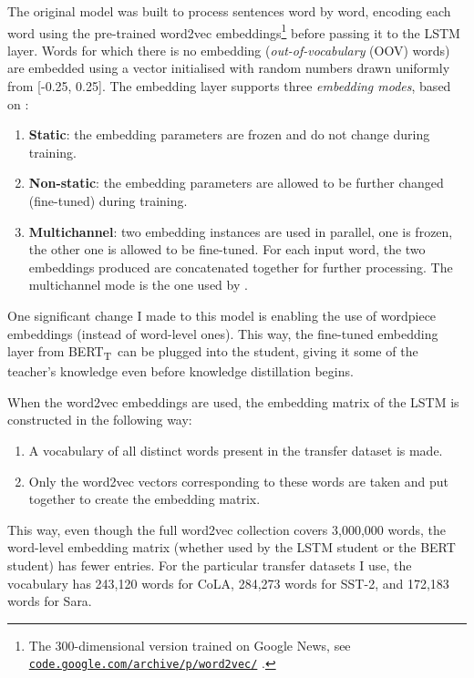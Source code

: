 \documentclass[bsc,frontabs,twoside,singlespacing,parskip,deptreport]{infthesis}
\def\BERTT{BERT\textsubscript{T}}
\newcommand\rurl[1]{%
  \href{https://#1}{\nolinkurl{#1}}%
}
\begin{document}
{{{      The original model was built to process sentences word by word, encoding each word using the pre-trained word2vec embeddings\footnote{The 300-dimensional version trained on Google News, see \rurl{code.google.com/archive/p/word2vec/}.} before passing it to the LSTM layer. Words for which there is no embedding (\textit{out-of-vocabulary} (OOV) words) are embedded using a vector initialised with random numbers drawn uniformly from [-0.25, 0.25]. The embedding layer supports three \textit{embedding modes}, based on \citet{Kim_2014}:
      \begin{enumerate}
        \item \textbf{Static}: the embedding parameters are frozen and do not change during training.
        \item \textbf{Non-static}: the embedding parameters are allowed to be further changed (fine-tuned) during training.
        \item \textbf{Multichannel}: two embedding instances are used in parallel, one is frozen, the other one is allowed to be fine-tuned. For each input word, the two embeddings produced are concatenated together for further processing. The multichannel mode is the one used by \citeauthor{Tang_2019b}.
      \end{enumerate}

      One significant change I made to this model is enabling the use of wordpiece embeddings (instead of word-level ones). This way, the fine-tuned embedding layer from \BERTT~can be plugged into the student, giving it some of the teacher's knowledge even before knowledge distillation begins.

      When the word2vec embeddings are used, the embedding matrix of the LSTM is constructed in the following way:
      \begin{enumerate}
        \item A vocabulary of all distinct words present in the transfer dataset is made.
        \item Only the word2vec vectors corresponding to these words are taken and put together to create the embedding matrix.
      \end{enumerate}
      This way, even though the full word2vec collection covers 3,000,000 words, the word-level embedding matrix (whether used by the LSTM student or the BERT student) has fewer entries. For the particular transfer datasets I use, the vocabulary has 243,120 words for CoLA, 284,273 words for SST-2, and 172,183 words for Sara.

}}}
\end{document}
